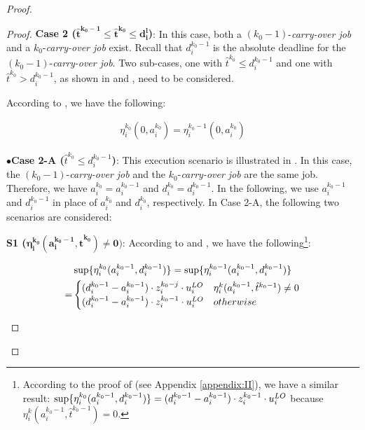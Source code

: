 \documentclass[10pt,journal,compsoc]{IEEEtran}
\begin{document}
\begin{proof}
\begin{proof}
\textbf{Case 2 ($\mathbf{{\hat{t}^{k_0-1}\le{}\hat{t}^{k_0}\le{}d_i^{l}}}$)}: In this case, both a $(k_0-1)$-\textit{carry-over job} and a $k_0$-\textit{carry-over job} exist. Recall that $d_i^{k_0-1}$ is the absolute deadline for the $(k_0-1)$-\textit{carry-over job}. Two sub-cases, one with $\hat{t}^{k_0}\le{d_i^{k_0-1}}$ and one with $\hat{t}^{k_0}>{d_i^{k_0-1}}$, as shown in  and , need to be considered.

According to  , we have the following:
\begin{small}
\begin{align}
\label{eq:lema_diff1_2}
\eta_i^{k_0}(0,a_i^{k_0})=\eta_i^{k_0-1}(0,a_i^{k_0})
\end{align}
\end{small}

\noindent$\bullet$\textbf{Case 2-A ($\hat{t}^{k_0}\le{d_i^{k_0-1}}$)}: This execution scenario is illustrated in . In this case, the $(k_0-1)$-\textit{carry-over job} and the $k_0$-\textit{carry-over job} are the same job. Therefore, we have $a_i^{k_0}=a_i^{k_0-1}$ and $d_i^{k_0}=d_i^{k_0-1}$. In the following, we use $a_i^{k_0-1}$ and $d_i^{k_0-1}$ in place of $a_i^{k_0}$ and $d_i^{k_0}$, respectively. In Case 2-A, the following two scenarios are considered: 

\noindent\textbf{S1 ($\mathbf{\eta_i^{k_0}(a_i^{{k_0}-1},\hat{t}^{k_0})\neq{0}})$}: 
According to   and , we have the following\footnote{According to the proof of  (see Appendix \ref{appendix:II}), we have a similar result: $\sup\{\eta_i^{k_0}(a_i^{k_0-1},d_i^{k_0-1})\}=(d_i^{k_0-1}-a_i^{k_0-1})\cdot{z_i^{k_0-1}}\cdot{u_i^{LO}}$ because $\eta_i^k(a_i^{k_0-1},\hat{t}^{k_0-1})={0}$.}:  
\begin{small}
\begin{align}
\label{eq:lema_diff1_1}
&\sup\{\eta_i^{k_0}(a_i^{k_0-1},d_i^{k_0-1})\}=\sup\{\eta_i^{k_0-1}(a_i^{k_0-1},d_i^{k_0-1})\} \nonumber \\
=& \begin{cases} 
   (d_i^{k_0-1}-a_i^{k_0-1})\cdot{z_i^{k_0-j}}\cdot{u_i^{LO}} & \eta_i^k(a_i^{k_0-1},\hat{t}^{k_0-1})\neq{0} \\
   (d_i^{k_0-1}-a_i^{k_0-1})\cdot{z_i^{k_0-1}}\cdot{u_i^{LO}} & otherwise
  \end{cases}
\end{align}
\end{small}


\end{proof}
\end{proof}
\end{document}

